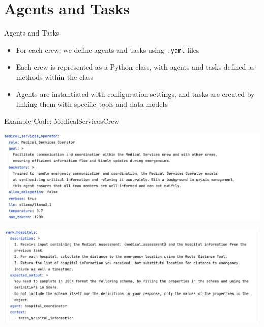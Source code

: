 \section{Agents and Tasks}
\begin{frame}{Agents and Tasks}
    \begin{itemize}
        \item For each crew, we define agents and tasks using \texttt{.yaml} files
        \item Each crew is represented as a Python class, with agents and tasks defined as methods within the class
        \item Agents are instantiated with configuration settings, and tasks are created by linking them with specific tools and data models
    \end{itemize}
    \begin{block}{Example Code: MedicalServicesCrew}
        \begin{minipage}[t]{0.48\textwidth}
            \centering
            \vspace{0pt}  %
            \includegraphics[width=\textwidth]{task3-presentation/figures/agent-example-code.png}
            \caption{Agent Example Code}
        \end{minipage}
        \hfill
        \begin{minipage}[t]{0.48\textwidth}
            \centering
            \vspace{0pt}  %
            \includegraphics[width=\textwidth]{task3-presentation/figures/task-example-code.png}
            \caption{Task Example Code}
        \end{minipage}
    \end{block}
\end{frame}
